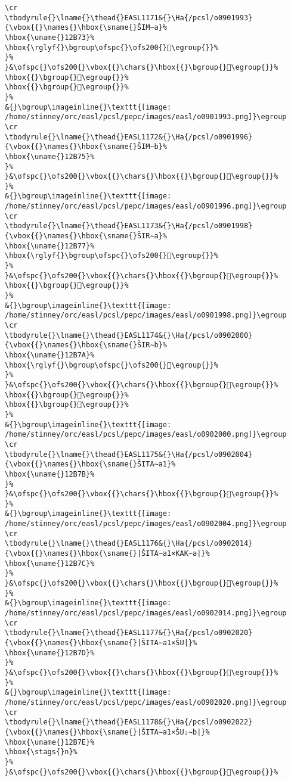 \begin{verbatim}
\cr
\tbodyrule{}\lname{}\thead{}EASL1171&{}\Ha{/pcsl/o0901993}{\vbox{{}\names{}\hbox{\sname{}ŠIM∼a}%
\hbox{\uname{}12B73}%
\hbox{\rglyf{}\bgroup\ofspc{}\ofs200{}𒭳\egroup{}}%
}%
}&\ofspc{}\ofs200{}\vbox{{}\chars{}\hbox{{}\bgroup{}𒭲\egroup{}}%
\hbox{{}\bgroup{}𒭳\egroup{}}%
\hbox{{}\bgroup{}𒭴\egroup{}}%
}%
&{}\bgroup\imageinline{}\texttt{[image: /home/stinney/orc/easl/pcsl/pepc/images/easl/o0901993.png]}\egroup
\cr
\tbodyrule{}\lname{}\thead{}EASL1172&{}\Ha{/pcsl/o0901996}{\vbox{{}\names{}\hbox{\sname{}ŠIM∼b}%
\hbox{\uname{}12B75}%
}%
}&\ofspc{}\ofs200{}\vbox{{}\chars{}\hbox{{}\bgroup{}𒭵\egroup{}}%
}%
&{}\bgroup\imageinline{}\texttt{[image: /home/stinney/orc/easl/pcsl/pepc/images/easl/o0901996.png]}\egroup
\cr
\tbodyrule{}\lname{}\thead{}EASL1173&{}\Ha{/pcsl/o0901998}{\vbox{{}\names{}\hbox{\sname{}ŠIR∼a}%
\hbox{\uname{}12B77}%
\hbox{\rglyf{}\bgroup\ofspc{}\ofs200{}𒭷\egroup{}}%
}%
}&\ofspc{}\ofs200{}\vbox{{}\chars{}\hbox{{}\bgroup{}𒭶\egroup{}}%
\hbox{{}\bgroup{}𒭷\egroup{}}%
}%
&{}\bgroup\imageinline{}\texttt{[image: /home/stinney/orc/easl/pcsl/pepc/images/easl/o0901998.png]}\egroup
\cr
\tbodyrule{}\lname{}\thead{}EASL1174&{}\Ha{/pcsl/o0902000}{\vbox{{}\names{}\hbox{\sname{}ŠIR∼b}%
\hbox{\uname{}12B7A}%
\hbox{\rglyf{}\bgroup\ofspc{}\ofs200{}𒭺\egroup{}}%
}%
}&\ofspc{}\ofs200{}\vbox{{}\chars{}\hbox{{}\bgroup{}𒭸\egroup{}}%
\hbox{{}\bgroup{}𒭹\egroup{}}%
\hbox{{}\bgroup{}𒭺\egroup{}}%
}%
&{}\bgroup\imageinline{}\texttt{[image: /home/stinney/orc/easl/pcsl/pepc/images/easl/o0902000.png]}\egroup
\cr
\tbodyrule{}\lname{}\thead{}EASL1175&{}\Ha{/pcsl/o0902004}{\vbox{{}\names{}\hbox{\sname{}ŠITA∼a1}%
\hbox{\uname{}12B7B}%
}%
}&\ofspc{}\ofs200{}\vbox{{}\chars{}\hbox{{}\bgroup{}𒭻\egroup{}}%
}%
&{}\bgroup\imageinline{}\texttt{[image: /home/stinney/orc/easl/pcsl/pepc/images/easl/o0902004.png]}\egroup
\cr
\tbodyrule{}\lname{}\thead{}EASL1176&{}\Ha{/pcsl/o0902014}{\vbox{{}\names{}\hbox{\sname{}|ŠITA∼a1×KAK∼a|}%
\hbox{\uname{}12B7C}%
}%
}&\ofspc{}\ofs200{}\vbox{{}\chars{}\hbox{{}\bgroup{}𒭼\egroup{}}%
}%
&{}\bgroup\imageinline{}\texttt{[image: /home/stinney/orc/easl/pcsl/pepc/images/easl/o0902014.png]}\egroup
\cr
\tbodyrule{}\lname{}\thead{}EASL1177&{}\Ha{/pcsl/o0902020}{\vbox{{}\names{}\hbox{\sname{}|ŠITA∼a1×ŠU|}%
\hbox{\uname{}12B7D}%
}%
}&\ofspc{}\ofs200{}\vbox{{}\chars{}\hbox{{}\bgroup{}𒭽\egroup{}}%
}%
&{}\bgroup\imageinline{}\texttt{[image: /home/stinney/orc/easl/pcsl/pepc/images/easl/o0902020.png]}\egroup
\cr
\tbodyrule{}\lname{}\thead{}EASL1178&{}\Ha{/pcsl/o0902022}{\vbox{{}\names{}\hbox{\sname{}|ŠITA∼a1×ŠU₂∼b|}%
\hbox{\uname{}12B7E}%
\hbox{\stags{}n}%
}%
}&\ofspc{}\ofs200{}\vbox{{}\chars{}\hbox{{}\bgroup{}𒭾\egroup{}}%

\end{verbatim}
